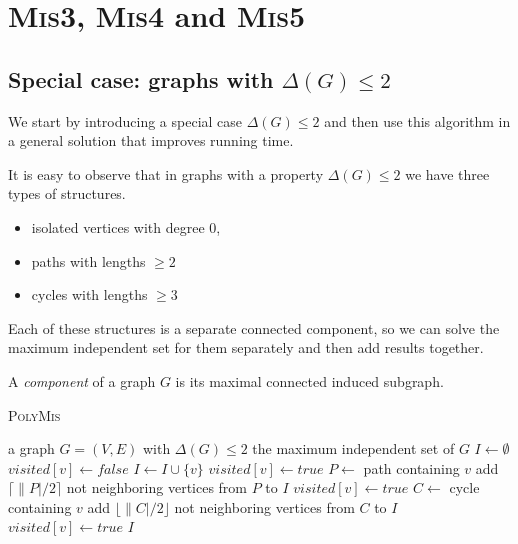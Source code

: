 \section{\textsc{Mis3}, \textsc{Mis4} and \textsc{Mis5}}

\subsection{Special case: graphs with $\Delta(G) \leq 2$}

We start by introducing a special case $\Delta(G) \leq 2$ and then use this algorithm in a general solution that improves running time. 

It is easy to observe that in graphs with a property $\Delta(G) \leq 2$ we have three types of structures.
\begin{itemize}
    \item isolated vertices with degree $0$,
    \item paths with lengths $\geq 2$
    \item cycles with lengths $\geq 3$
\end{itemize}

Each of these structures is a separate connected component, so we can solve the maximum independent set for them separately and then add results together.

\begin{defn}[component]
A \emph{component} of a graph $G$ is its maximal connected induced subgraph.
\end{defn}

\begin{algorithm}[H]
\caption{\textsc{PolyMis}}\label{alg:poly}
\begin{algorithmic}[1]
\Require a graph $G=(V,E)$ with $\Delta(G) \leq 2$
\Ensure the maximum independent set of $G$
    \State $I \gets \emptyset $
        \State $visited[v] \gets false$
    \EndFor
        \State $I \gets I \cup \{v\}$
        \State $visited[v] \gets true$
    \EndFor
        \State $P \gets$ path containing $v$
        \State add $\lceil\|P|/2\rceil$ not neighboring vertices from $P$ to $I$
            \State $visited[v] \gets true$
        \EndFor
    \EndFor
        \State $C\gets$ cycle containing $v$
        \State add $\lfloor\|C|/2\rfloor$ not neighboring vertices from $C$ to $I$
            \State $visited[v] \gets true$
        \EndFor
    \EndFor
    \State \Return $I$
\EndProcedure
\end{algorithmic}
\end{algorithm}

